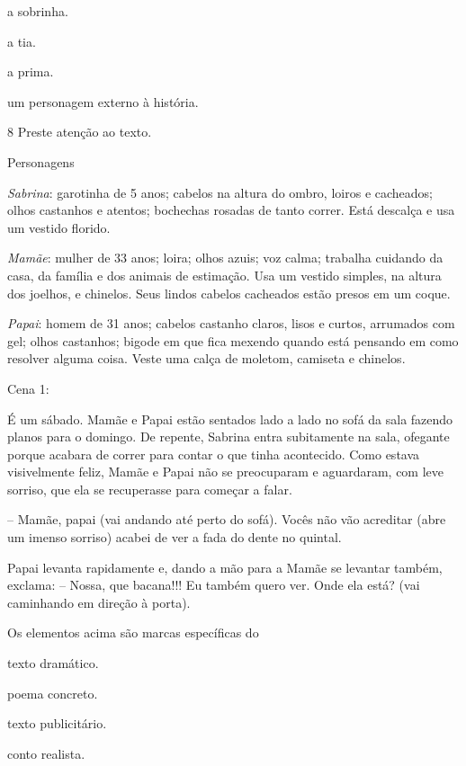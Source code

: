 \begin{escolha}
\item a sobrinha.

\item a tia.

\item a prima.

\item um personagem externo à história.
\end{escolha}


\num{8} Preste atenção ao texto.

\begin{myquote}
Personagens

\emph{Sabrina}: garotinha de 5 anos; cabelos na altura do ombro, loiros
e cacheados; olhos castanhos e atentos; bochechas rosadas de tanto
correr. Está descalça e usa um vestido florido.

\emph{Mamãe}: mulher de 33 anos; loira; olhos azuis; voz calma; trabalha
cuidando da casa, da família e dos animais de estimação. Usa um vestido
simples, na altura dos joelhos, e chinelos. Seus lindos cabelos
cacheados estão presos em um coque.

\emph{Papai}: homem de 31 anos; cabelos castanho claros, lisos e curtos,
arrumados com gel; olhos castanhos; bigode em que fica mexendo quando
está pensando em como resolver alguma coisa. Veste uma calça de moletom,
camiseta e chinelos.

Cena 1:

É um sábado. Mamãe e Papai estão sentados lado a lado no sofá da sala
fazendo planos para o domingo. De repente, Sabrina entra subitamente na
sala, ofegante porque acabara de correr para contar o que tinha
acontecido. Como estava visivelmente feliz, Mamãe e Papai não se
preocuparam e aguardaram, com leve sorriso, que ela se recuperasse para
começar a falar.

-- Mamãe, papai (vai andando até perto do sofá). Vocês não vão acreditar
(abre um imenso sorriso) acabei de ver a fada do dente no quintal.

Papai levanta rapidamente e, dando a mão para a Mamãe se levantar
também, exclama: -- Nossa, que bacana!!! Eu também quero ver. Onde ela
está? (vai caminhando em direção à porta).

\end{myquote}

Os elementos acima são marcas específicas do

\begin{escolha}
\item texto dramático.

\item poema concreto.

\item texto publicitário.

\item conto realista.
\end{escolha}

